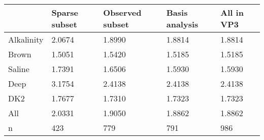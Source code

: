 \begin{tabular}{lllll}
\toprule
 & Sparse subset & Observed subset & Basis analysis & All in VP3 \\
\midrule
Alkalinity & 2.0674 & 1.8990 & 1.8814 & 1.8814 \\
Brown & 1.5051 & 1.5420 & 1.5185 & 1.5185 \\
Saline & 1.7391 & 1.6506 & 1.5930 & 1.5930 \\
Deep & 3.1754 & 2.4138 & 2.4138 & 2.4138 \\
DK2 & 1.7677 & 1.7310 & 1.7323 & 1.7323 \\
All & 2.0331 & 1.9050 & 1.8862 & 1.8862 \\
n & 423 & 779 & 791 & 986 \\
\bottomrule
\end{tabular}
